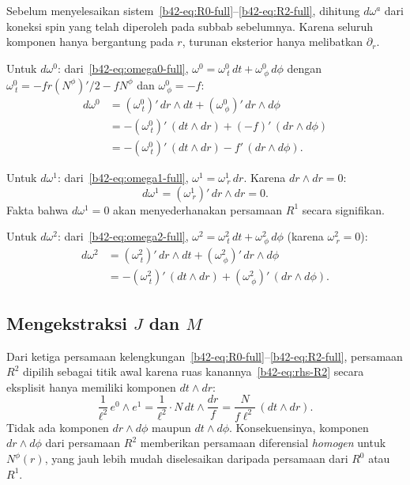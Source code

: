 Sebelum menyelesaikan sistem~\eqref{b42-eq:R0-full}--\eqref{b42-eq:R2-full}, dihitung $d\omega^a$ dari koneksi spin yang telah diperoleh pada subbab sebelumnya. Karena seluruh komponen hanya bergantung pada $r$, turunan eksterior hanya melibatkan $\partial_r$.

\noindent Untuk $d\omega^0$: dari~\eqref{b42-eq:omega0-full}, $\omega^0 = \omega^0_{\ t}\,dt + \omega^0_{\ \phi}\,d\phi$ dengan $\omega^0_{\ t} = -fr(N^\phi)'/2 - fN^\phi$ dan $\omega^0_{\ \phi} = -f$:
\begin{align}
    d\omega^0 &= (\omega^0_{\ t})'\,dr \wedge dt + (\omega^0_{\ \phi})'\,dr \wedge d\phi \nonumber\\[4pt]
    &= -(\omega^0_{\ t})'\,(dt \wedge dr) + (-f)'\,(dr \wedge d\phi) \nonumber\\[4pt]
    &= -(\omega^0_{\ t})'\,(dt \wedge dr) - f'\,(dr \wedge d\phi). \label{b42-eq:dw0}
\end{align}

\noindent Untuk $d\omega^1$: dari~\eqref{b42-eq:omega1-full}, $\omega^1 = \omega^1_{\ r}\,dr$. Karena $dr \wedge dr = 0$:
\begin{equation}
    d\omega^1 = (\omega^1_{\ r})'\,dr \wedge dr = 0. \label{b42-eq:dw1}
\end{equation}
Fakta bahwa $d\omega^1 = 0$ akan menyederhanakan persamaan $R^1$ secara signifikan.

\noindent Untuk $d\omega^2$: dari~\eqref{b42-eq:omega2-full}, $\omega^2 = \omega^2_{\ t}\,dt + \omega^2_{\ \phi}\,d\phi$ (karena $\omega^2_{\ r} = 0$):
\begin{align}
    d\omega^2 &= (\omega^2_{\ t})'\,dr \wedge dt + (\omega^2_{\ \phi})'\,dr \wedge d\phi \nonumber\\[4pt]
    &= -(\omega^2_{\ t})'\,(dt \wedge dr) + (\omega^2_{\ \phi})'\,(dr \wedge d\phi). \label{b42-eq:dw2}
\end{align}

\subsection{Mengekstraksi $J$ dan $M$}
\label{b42-sec:decouple}

Dari ketiga persamaan kelengkungan~\eqref{b42-eq:R0-full}--\eqref{b42-eq:R2-full}, persamaan $R^2$ dipilih sebagai titik awal karena ruas kanannya~\eqref{b42-eq:rhs-R2} secara eksplisit hanya memiliki komponen $dt \wedge dr$:
\begin{equation}
    \frac{1}{\ell^2}\,e^0 \wedge e^1 = \frac{1}{\ell^2}\cdot N\,dt \wedge \frac{dr}{f} = \frac{N}{f\ell^2}\,(dt \wedge dr). \label{b42-eq:R2-rhs-explicit}
\end{equation}
Tidak ada komponen $dr \wedge d\phi$ maupun $dt \wedge d\phi$. Konsekuensinya, komponen $dr \wedge d\phi$ dari persamaan $R^2$ memberikan persamaan diferensial \emph{homogen} untuk $N^\phi(r)$, yang jauh lebih mudah diselesaikan daripada persamaan dari $R^0$ atau $R^1$.

